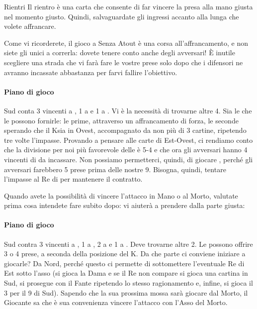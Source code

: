 \documentclass[../corsofiori.tex]{subfiles}
\begin{document}
\medskip
\begin{regola}{Rientri}
    Il rientro è una carta che consente di far vincere la presa alla mano giusta nel momento giusto. Quindi,
    salvaguardate gli ingressi accanto alla lunga che volete affrancare.
\end{regola}
\medskip


Come vi ricorderete, il gioco a Senza Atout è una corsa all'affrancamento, e non siete gli unici a correrla: dovete
tenere conto anche degli avversari! \`E inutile scegliere una strada che vi farà fare le vostre prese solo dopo che
i difensori ne avranno incassate abbastanza per farvi fallire l'obiettivo.

\newgame
{}
\leftupper{\boardtext*}%
{\dealertext\quad}{\vulnertext}

\showAll*

\paragraph{Piano di gioco} Sud conta 3 vincenti a \pic, 1 a \cu e 1 a \qu. Vi è la necessità di trovarne altre 4. Sia le
\fio che le \qu possono fornirle: le prime, attraverso un affrancamento di forza, le seconde sperando che il K\Di sia in
Ovest, accompagnato da non più di 3 cartine, ripetendo tre volte l'impasse.
Provando a pensare alle carte di Est-Ovest, ci rendiamo conto che la divisione per noi più favorevole delle \cu è 5-4
e che ora gli avversari hanno 4 vincenti di \cu da incassare. Non possiamo permetterci, quindi, di giocare \fio, perché
gli avversari farebbero 5 prese prima delle nostre 9. Bisogna, quindi, tentare l'impasse al Re di \qu per mantenere il
contratto.

Quando avete la possibilità di vincere l'attacco in Mano o al Morto, valutate prima cosa intendete fare subito dopo: vi
aiuterà a prendere dalla parte giusta:

\newgame
{}
\leftupper{\boardtext*}%
{\dealertext\quad}{\vulnertext}
\rightlower[2ex]{\lead: 2\Di}{}{}

\showAll*

\paragraph{Piano di gioco} Sud contra 3 vincenti a \pic, 1 a \cu, 2 a \qu e 1 a \fio. Deve trovarne altre 2. Le \fio
possono offrire 3 o 4 prese, a seconda della posizione del K\Cl. Da che parte ci conviene iniziare a giocarle? Da Nord,
perché questo ci permette di sottomettere l'eventuale Re di Est sotto l'asso (si gioca la Dama e se il Re non compare si
gioca una cartina in Sud, si prosegue con il Fante ripetendo lo stesso ragionamento e, infine, si gioca il 3 per il 9 di
Sud). Sapendo che la sua prossima mossa sarà giocare \fio dal Morto, il Giocante sa che è sua convenienza vincere
l'attacco con l'Asso del Morto.
\end{document}
